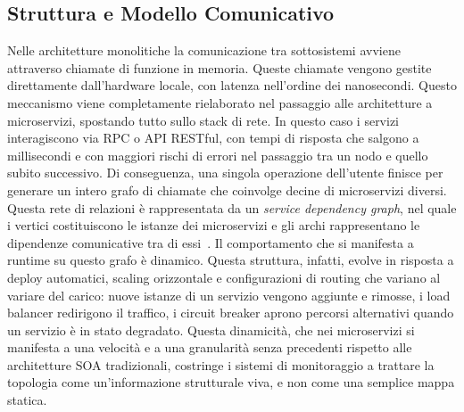 \subsection{Struttura e Modello Comunicativo}
\label{subsec:struttura_comunicazione}

Nelle architetture monolitiche la comunicazione tra sottosistemi avviene attraverso chiamate 
di funzione in memoria. Queste chiamate vengono gestite direttamente dall'hardware locale, 
con latenza nell'ordine dei nanosecondi. Questo meccanismo viene completamente rielaborato 
nel passaggio alle architetture a microservizi, spostando tutto sullo stack di rete. 
In questo caso i servizi interagiscono via \gls{RPC} o \gls{API} RESTful, con tempi di risposta che salgono 
a millisecondi e con maggiori rischi di errori nel passaggio tra un nodo e quello subito successivo. 
Di conseguenza, una singola operazione dell'utente finisce per generare un intero grafo 
di chiamate che coinvolge decine di microservizi diversi. \\
Questa rete di relazioni è rappresentata da un \emph{service dependency graph}, nel quale i vertici 
costituiscono le istanze dei microservizi e gli archi rappresentano le dipendenze comunicative tra di essi~\cite{qiu2020firm}. 
Il comportamento che si manifesta a runtime su questo grafo è dinamico. Questa struttura, infatti, 
evolve in risposta a deploy automatici, scaling orizzontale e configurazioni di routing che variano 
al variare del carico: nuove istanze di un servizio vengono aggiunte e rimosse, i load balancer redirigono il traffico, 
i circuit breaker aprono percorsi alternativi quando un servizio è in stato degradato. 
Questa dinamicità, che nei microservizi si manifesta a una velocità e a una granularità 
senza precedenti rispetto alle architetture \gls{SOA} tradizionali, costringe i sistemi di monitoraggio a 
trattare la topologia come un'informazione strutturale viva, e non come una semplice mappa statica.

